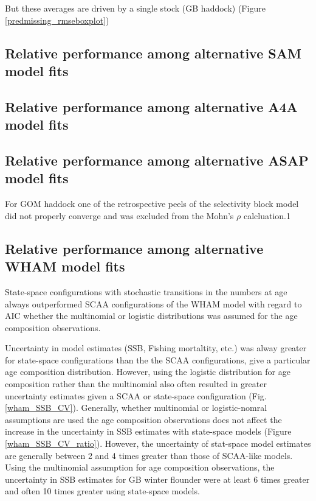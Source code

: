 \documentclass[12pt,letterpaper, leqno]{article}
\begin{document}
But these averages are driven by a single stock (GB haddock) (Figure \ref{predmissing_rmseboxplot})

\subsection*{Relative performance among alternative SAM model fits}
                                        
\subsection*{Relative performance among alternative A4A model fits}

\subsection*{Relative performance among alternative ASAP model fits}

For GOM haddock one of the retrospective peels of the selectivity block model did not properly converge and was excluded from the Mohn's $\rho$ calcluation.1

\subsection*{Relative performance among alternative WHAM model fits}

State-space configurations with stochastic transitions in the numbers at age always outperformed SCAA configurations of the WHAM model with regard to AIC whether the multinomial or logistic distributions was assumed for the age composition observations. 

Uncertainty in model estimates (SSB, Fishing mortaltity, etc.) was alway greater for state-space configurations than the the SCAA configurations, give a particular age composition distribution. However, using the logistic distribution for age composition rather than the multinomial also often resulted in greater uncertainty estimates given a SCAA or state-space configuration (Fig. \ref{wham_SSB_CV}). Generally, whether multinomial or logistic-nomral assumptions are used the age composition observations does not affect the increase in the uncertainty in SSB estimates with state-space models  (Figure \ref{wham_SSB_CV_ratio}). However, the uncertainty of stat-space model estimates are generally between 2 and 4 times greater than those of SCAA-like models. Using the multinomial assumption for age composition observations, the uncertainty in SSB estimates for GB winter flounder were at least 6 times greater and often 10 times greater using state-space models.
\end{document}
